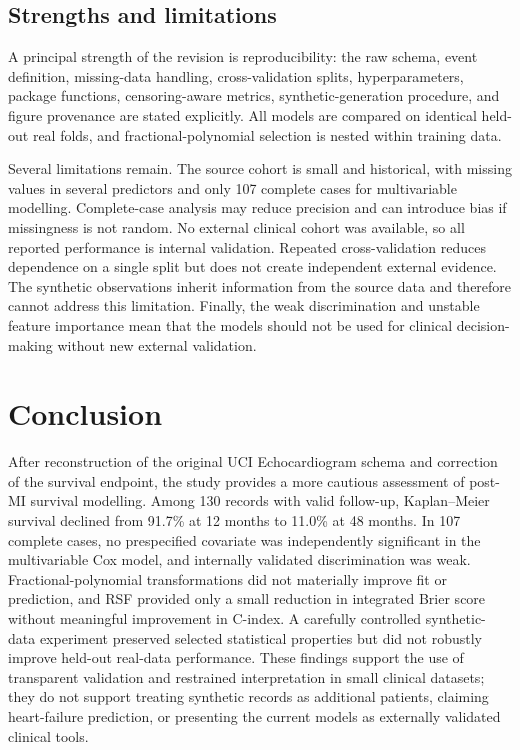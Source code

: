 \documentclass[a4paper,12pt]{article}
\begin{document}
\subsection{Strengths and limitations}
A principal strength of the revision is reproducibility: the raw schema, event definition, missing-data handling, cross-validation splits, hyperparameters, package functions, censoring-aware metrics, synthetic-generation procedure, and figure provenance are stated explicitly. All models are compared on identical held-out real folds, and fractional-polynomial selection is nested within training data.

Several limitations remain. The source cohort is small and historical, with missing values in several predictors and only 107 complete cases for multivariable modelling. Complete-case analysis may reduce precision and can introduce bias if missingness is not random. No external clinical cohort was available, so all reported performance is internal validation. Repeated cross-validation reduces dependence on a single split but does not create independent external evidence. The synthetic observations inherit information from the source data and therefore cannot address this limitation. Finally, the weak discrimination and unstable feature importance mean that the models should not be used for clinical decision-making without new external validation.

\section{Conclusion}
After reconstruction of the original UCI Echocardiogram schema and correction of the survival endpoint, the study provides a more cautious assessment of post-MI survival modelling. Among 130 records with valid follow-up, Kaplan--Meier survival declined from 91.7\% at 12 months to 11.0\% at 48 months. In 107 complete cases, no prespecified covariate was independently significant in the multivariable Cox model, and internally validated discrimination was weak. Fractional-polynomial transformations did not materially improve fit or prediction, and RSF provided only a small reduction in integrated Brier score without meaningful improvement in C-index. A carefully controlled synthetic-data experiment preserved selected statistical properties but did not robustly improve held-out real-data performance. These findings support the use of transparent validation and restrained interpretation in small clinical datasets; they do not support treating synthetic records as additional patients, claiming heart-failure prediction, or presenting the current models as externally validated clinical tools.
\end{document}
